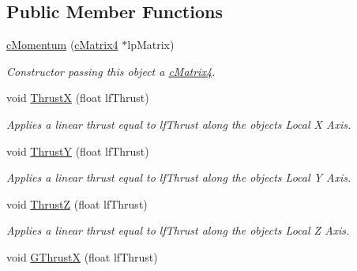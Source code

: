 \subsection*{Public Member Functions}
\begin{DoxyCompactItemize}
\item 
\hypertarget{classc_momentum_a816c2fe90c305565b30f890a24b034ff}{
\hyperlink{classc_momentum_a816c2fe90c305565b30f890a24b034ff}{cMomentum} (\hyperlink{classc_matrix4}{cMatrix4} $\ast$lpMatrix)}
\label{classc_momentum_a816c2fe90c305565b30f890a24b034ff}

\begin{DoxyCompactList}\small\item\em Constructor passing this object a \hyperlink{classc_matrix4}{cMatrix4}. \end{DoxyCompactList}\item 
\hypertarget{classc_momentum_a4c8e14d57f23820fd66f4f90b0b0cf0c}{
void \hyperlink{classc_momentum_a4c8e14d57f23820fd66f4f90b0b0cf0c}{ThrustX} (float lfThrust)}
\label{classc_momentum_a4c8e14d57f23820fd66f4f90b0b0cf0c}

\begin{DoxyCompactList}\small\item\em Applies a linear thrust equal to lfThrust along the objects Local X Axis. \end{DoxyCompactList}\item 
\hypertarget{classc_momentum_a75f2ef092c9833a7ddef951e0a851519}{
void \hyperlink{classc_momentum_a75f2ef092c9833a7ddef951e0a851519}{ThrustY} (float lfThrust)}
\label{classc_momentum_a75f2ef092c9833a7ddef951e0a851519}

\begin{DoxyCompactList}\small\item\em Applies a linear thrust equal to lfThrust along the objects Local Y Axis. \end{DoxyCompactList}\item 
\hypertarget{classc_momentum_a391c5ecfd1f3bc59b77dc1f3846a3abc}{
void \hyperlink{classc_momentum_a391c5ecfd1f3bc59b77dc1f3846a3abc}{ThrustZ} (float lfThrust)}
\label{classc_momentum_a391c5ecfd1f3bc59b77dc1f3846a3abc}

\begin{DoxyCompactList}\small\item\em Applies a linear thrust equal to lfThrust along the objects Local Z Axis. \end{DoxyCompactList}\item 
\hypertarget{classc_momentum_accf174f3d17297f2b13b32c69465459f}{
void \hyperlink{classc_momentum_accf174f3d17297f2b13b32c69465459f}{GThrustX} (float lfThrust)}
\label{classc_momentum_accf174f3d17297f2b13b32c69465459f}


\end{DoxyCompactItemize}
